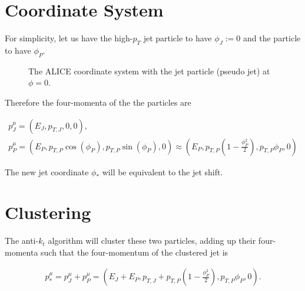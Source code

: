 \documentclass[
  a4paper,
  12pt,
  oneside,
  parskip=half,
  listof=totoc,
  bibliography=totoc,
  DIV=12,
  numbers=noenddot
  ]{scrartcl}
\begin{document}
\section{Coordinate System}

For simplicity, let us have the high-$p_T$ jet particle to have $\phi_J := 0$ and the particle to have $\phi_P$.

\begin{figure}[H]
	\centering
	\caption{The ALICE coordinate system with the jet particle (pseudo jet) at $\phi = 0$.}
\end{figure}

Therefore the four-momenta of the the particles are

\begin{equation}
	\begin{gathered}
		p_J^\mu = (E_J, p_{T,J}, 0, 0), \\
		p_P^\mu = (E_P, p_{T,P} \cos(\phi_P), p_{T,P} \sin(\phi_P), 0) \approx (E_P, p_{T,P} (1-\frac{\phi_P^2}{2}), p_{T,P} \phi_P, 0)
	\end{gathered}
\end{equation}

The new jet coordinate $\phi_*$ will be equivalent to the jet shift. 

\section{Clustering}

The anti-$k_t$ algorithm will cluster these two particles, adding up their four-momenta such that the four-momentum of the clustered jet is

\begin{equation}
	\begin{gathered}
		p_*^\mu = p_J^\mu + p_P^\mu = (E_J + E_P, p_{T,J} + p_{T,P}(1 - \frac{\phi_P^2}{2}), p_{T,P} \phi_P, 0) .
	\end{gathered}
\end{equation}
\end{document}
